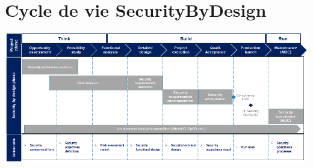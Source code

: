 \section{Cycle de vie SecurityByDesign}
\label{appendix:securitybydesign}
\vspace{2em}
\centering
\includegraphics[width=0.8\textheight, angle=90,origin=c]{resources/img/security_by_design.png}